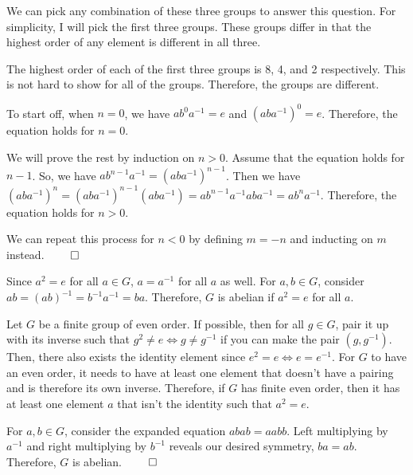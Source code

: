 \documentclass{report}
\begin{document}
We can pick any combination of these three groups to answer this question. For simplicity, I will pick the first three groups. These groups differ in that the highest order of any element is different in all three. 


The highest order of each of the first three groups is 8, 4, and 2 respectively. This is not hard to show for all of the groups. Therefore, the groups are different.

\sol To start off, when $n=0$, we have $ab^0a^{-1} = e$ and $(aba^{-1})^0 = e$. Therefore, the equation holds for $n=0$.

We will prove the rest by induction on $n > 0$. Assume that the equation holds for $n-1$. So, we have $ab^{n-1}a^{-1} = (aba^{-1})^{n-1}$. Then we have $(aba^{-1})^{n} = (aba^{-1})^{n-1} (aba^{-1}) = ab^{n-1}a^{-1}aba^{-1} = ab^{n}a^{-1}$. Therefore, the equation holds for $n > 0$.

We can repeat this process for $n < 0$ by defining $m = -n$ and inducting on $m$ instead. $\qed$

\sol Since $a^2 = e$ for all $a \in G$, $a = a^{-1}$ for all $a$ as well. For $a,b \in G$, consider $ab = (ab)^{-1} = b^{-1}a^{-1} = ba$. Therefore, $G$ is abelian if $a^2 = e$ for all $a$.

\sol Let $G$ be a finite group of even order. If possible, then for all $g \in G$, pair it up with its inverse such that $g^2 \neq e \iff g \neq g^{-1}$ if you can make the pair $(g, g^{-1})$. Then, there also exists the identity element since $e^2 = e \iff e = e^{-1}$. For $G$ to have an even order, it needs to have at least one element that doesn't have a pairing and is therefore its own inverse. Therefore, if $G$ has finite even order, then it has at least one element $a$ that isn't the identity such that $a^2 = e$.

\sol For $a,b \in G$, consider the expanded equation $abab = aabb$. Left multiplying by $a^{-1}$ and right multiplying by $b^{-1}$ reveals our desired symmetry, $ba = ab$. Therefore, $G$ is abelian. $\qed$
\end{document}

